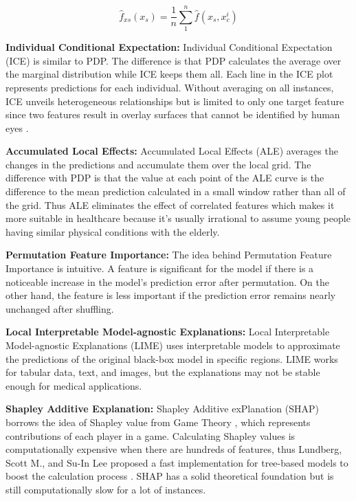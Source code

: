 \begin{equation}
    \label{eq:1}
    \hat{f}_{xs}(x_s) = \frac{1}{n}\sum_{1}^{n}\hat{f}(x_s, x_c^{i})
\end{equation}

\textbf{Individual Conditional Expectation: } Individual Conditional Expectation (ICE) is similar to PDP. The difference is that PDP calculates the average over the marginal distribution while ICE keeps them all. Each line in the ICE plot represents predictions for each individual. Without averaging on all instances, ICE unveils heterogeneous relationships but is limited to only one target feature since two features result in overlay surfaces that cannot be identified by human eyes \citep{molnar2019}.

\textbf{Accumulated Local Effects: } Accumulated Local Effects (ALE) averages the changes in the predictions and accumulate them over the local grid. The difference with PDP is that the value at each point of the ALE curve is the difference to the mean prediction calculated in a small window rather than all of the grid. Thus ALE eliminates the effect of correlated features \citep{molnar2019} which makes it more suitable in healthcare because it's usually irrational to assume young people having similar physical conditions with the elderly.


\textbf{Permutation Feature Importance: } The idea behind Permutation Feature Importance is intuitive. A feature is significant for the model if there is a noticeable increase in the model's prediction error after permutation. On the other hand, the feature is less important if the prediction error remains nearly unchanged after shuffling.

\textbf{Local Interpretable Model-agnostic Explanations:} Local Interpretable Model-agnostic Explanations (LIME) uses interpretable models to approximate the predictions of the original black-box model in specific regions. LIME works for tabular data, text, and images, but the explanations may not be stable enough for medical applications.

\textbf{Shapley Additive Explanation: } Shapley Additive exPlanation (SHAP) borrows the idea of Shapley value from Game Theory \citep{shapley_1953}, which represents contributions of each player in a game. Calculating Shapley values is computationally expensive when there are hundreds of features, thus Lundberg, Scott M., and Su-In Lee proposed a fast implementation for tree-based models to boost the calculation process \citep{lundberg2017unified}. SHAP has a solid theoretical foundation but is still computationally slow for a lot of instances.


